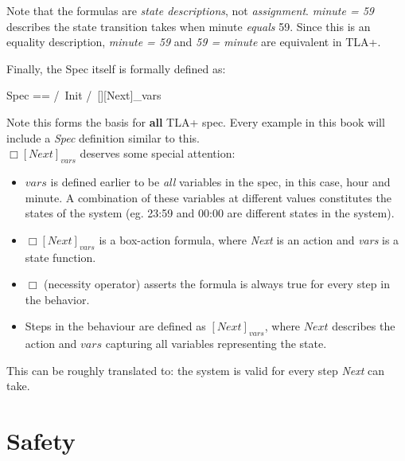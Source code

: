 Note that the formulas are \textit{state descriptions}, not \textit{assignment}.
\textit{minute = 59} describes the state transition takes when minute
\textit{equals} 59. Since this is an equality description, \textit{minute = 59}
and \textit{59 = minute} are equivalent in TLA+.\newline

Finally, the Spec itself is formally defined as:\newline
\begin{tla}
    Spec ==
        /\ Init
        /\ [][Next]_vars
\end{tla}
\begin{tlatex}
%
%
%
%
\end{tlatex}
\newline

Note this forms the basis for \textbf{all} TLA+ spec. Every example in this book
will include a \textit{Spec} definition similar to this.\\

$\Box[Next]_{vars}$ deserves some special attention:
\begin{itemize}
    \item $vars$ is defined earlier to be \textit{all} variables in the spec, in
    this case, hour and minute. A combination of these variables at different
    values constitutes the states of the system (eg. 23:59 and 00:00 are different states in the system).
    \item $\Box[Next]_{vars}$ is a box-action formula, where \textit{Next} is an
    action and \textit{vars} is a state function.
    \item $\Box$ (necessity operator) asserts the formula is always true for every step in the behavior.
    \item Steps in the behaviour are defined as $[Next]_{vars}$, where $Next$
    describes the action and $vars$ capturing all variables representing the state.
\end{itemize}

This can be roughly translated to: the system is valid for every step
\textit{Next} can take.

\section{Safety}


